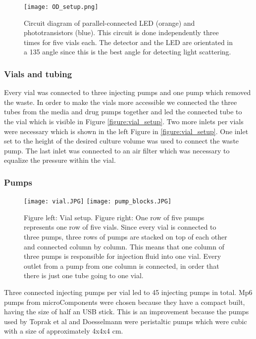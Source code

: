 \begin{figure}
	\texttt{[image: OD\_setup.png]}
	\caption{Circuit diagram of parallel-connected LED (orange) and phototransistors (blue). This circuit is done independently three times for five vials each. The detector and the LED are orientated in a 135 \degree  angle since this is the best angle for detecting light scattering.}
	\label{figure:OD_cirguit}
\end{figure}

\subsubsection{Vials and tubing}
Every vial was connected to three injecting pumps and one pump which removed the waste. In order to make the vials more accessible we connected the three tubes from the media and drug pumps together and led the connected tube to the vial which is visible in Figure \ref{figure:vial_setup}. Two more inlets per vials were necessary which is shown in the left Figure in \ref{figure:vial_setup}. One inlet set to the height of the desired culture volume was used to connect the waste pump. The last inlet was connected to an air filter which was necessary to equalize the pressure within the vial. 

\subsubsection{Pumps} 
\begin{figure}
	\texttt{[image: vial.JPG]}
	\texttt{[image: pump\_blocks.JPG]}
	\caption{Figure left: Vial setup. Figure right: One row of five pumps represents one row of five vials. Since every vial is connected to three pumps, three rows of pumps are stacked on top of each other and connected column by column. This means that one column of three pumps is responsible for injection fluid into one vial. Every outlet from a pump from one column is connected, in order that there is just one tube going to one vial. }
	\label{figure:tubing_setup}
\end{figure}
Three connected injecting pumps per vial led to 45 injecting pumps in total. Mp6 pumps from microComponents were chosen because they have a compact built, having the size of half an USB stick. This is an improvement because the pumps used by Toprak et al \cite{toprak_building_2013} and Doesselmann \cite{doselmann_rapid_2017} were peristaltic pumps which were cubic with a size of approximately 4x4x4 cm. 

